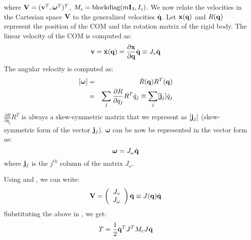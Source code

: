 where $\mathbf{V} = (\mathbf{v}^T,\bm{\omega}^T)^T$, $M_c = \mbox{blockdiag}(m\mathbf{I}_3,I_c)$. We now relate the velocities in the Cartesian space $\mathbf{V}$ to the generalized velocities $\dot{\mathbf{q}}$. Let $\mathbf{x}(\mathbf{q})$ and $R(\mathbf{q})$ represent the position of the COM and the rotation matrix of the rigid body. The linear velocity of the COM is computed as:
\begin{eqnarray}
\label{eq:vellin}
\mathbf{v} = \dot{\mathbf{x}}(\mathbf{q}) = \frac{\partial \mathbf{x}}{\partial \mathbf{q}} \dot{\mathbf{q}} \equiv J_v \dot{\mathbf{q}}
\end{eqnarray}
The angular velocity is computed as:
\begin{eqnarray}
\nonumber
[\bm{\omega}] & = & \dot{R}(\mathbf{q})R^T(\mathbf{q}) \\
\label{eq:Jaccolj}
& = & \sum_j \frac{\partial R}{\partial q_j}R^T \dot{q}_j \equiv \sum_j [\mathbf{j}_{j}] \dot{q}_j
\end{eqnarray}
$\frac{\partial R}{\partial q_j}R^T$ is always a skew-symmetric matrix that we represent as $[\mathbf{j}_{j}]$ (skew-symmetric form of the vector $\mathbf{j}_j$). $\bm{\omega}$ can be now be represented in the vector form as:
\begin{equation}
\label{eq:velang}
\bm{\omega} = J_{\omega} \dot{\mathbf{q}}
\end{equation}
where $\mathbf{j}_{j}$ is the $j^{th}$ column of the matrix $J_{\omega}$.

Using  and , we can write:
\begin{equation}
\label{eq:velcartall}
\mathbf{V} = \left(
\begin{array}{c}
J_v \\
J_{\omega}
\end{array}
\right) \dot{\mathbf{q}} \equiv J(\mathbf{q})\dot{\mathbf{q}}
\end{equation}
Substituting the above in , we get:
\begin{equation}
T = \frac{1}{2}\dot{\mathbf{q}}^T J^T M_c J \dot{\mathbf{q}}
\end{equation}

